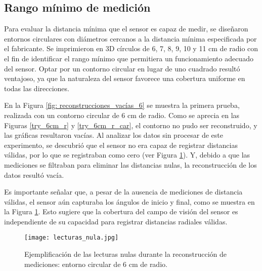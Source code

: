 \subsection{Rango mínimo de medición}
Para evaluar la distancia mínima que el sensor es capaz de medir, se diseñaron entornos circulares con diámetros cercanos a la distancia mínima especificada por el fabricante. Se imprimieron en 3D círculos de 6, 7, 8, 9, 10 y 11 cm de radio con el fin de identificar el rango mínimo que permitiera un funcionamiento adecuado del sensor. Optar por un contorno circular en lugar de uno cuadrado resultó ventajoso, ya que la naturaleza del sensor favorece una cobertura uniforme en todas las direcciones.

En la Figura \ref{fig: reconstrucciones_vacías_6} se muestra la primera prueba, realizada con un contorno circular de 6 cm de radio. Como se aprecia en las Figuras \ref{try_6cm_r} y \ref{try_6cm_r_car}, el contorno no pudo ser reconstruido, y las gráficas resultaron vacías. Al analizar los datos sin procesar de este experimento, se descubrió que el sensor no era capaz de registrar distancias válidas, por lo que se registraban como cero (ver Figura \ref{fig:data_null}). Y, debido a que las mediciones se filtraban para eliminar las distancias nulas, la reconstrucción de los datos resultó vacía. 

Es importante señalar que, a pesar de la ausencia de mediciones de distancia válidas, el sensor aún capturaba los ángulos de inicio y final, como se muestra en la Figura \ref{fig:data_null}. Esto sugiere que la cobertura del campo de visión del sensor es independiente de su capacidad para registrar distancias radiales válidas.
\begin{figure}[H]
	\centering
	\texttt{[image: lecturas\_nula.jpg]}
	\caption{Ejemplificación de las lecturas nulas durante la reconstrucción de mediciones: entorno circular de 6 cm de radio.}
	\label{fig:data_null}
\end{figure}

